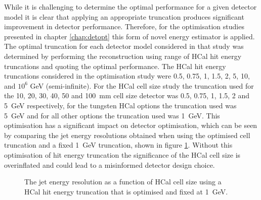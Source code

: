 While it is challenging to determine the optimal performance for a given detector model it is clear that applying an appropriate truncation produces significant improvement in detector performance.  Therefore, for the optimisation studies presented in chapter \ref{chap:detopt} this form of novel energy estimator is applied.  The optimal truncation for each detector model considered in that study was determined by performing the reconstruction using range of HCal hit energy truncations and quoting the optimal performance.  The HCal hit energy truncations considered in the optimisation study were 0.5, 0.75, 1, 1.5, 2, 5, 10, and $10^{6}$ GeV (semi-infinite).  For the HCal cell size study the truncation used for the 10, 20, 30, 40, 50 and 100~mm cell size detector was 0.5, 0.75, 1, 1.5, 2 and 5~GeV respectively, for the tungsten HCal options the truncation used was 5~GeV and for all other options the truncation used was 1~GeV.  This optimisation has a significant impact on detector optimisation, which can be seen by comparing the jet energy resolutions obtained when using the optimised cell truncation and a fixed 1~GeV truncation, shown in figure \ref{fig:jerhcalcellopt}.  Without this optimisation of hit energy truncation the significance of the HCal cell size is overinflated and could lead to a misinformed detector design choice.  

\begin{figure}[h!]
\caption[The jet energy resolution as a function of HCal cell size using a HCal hit energy truncation that is \protect{} optimised and \protect{} fixed at 1~GeV.]{The jet energy resolution as a function of HCal cell size using a HCal hit energy truncation that is \protect{} optimised and \protect{} fixed at 1~GeV.}
\label{fig:jerhcalcellopt}
\end{figure}

